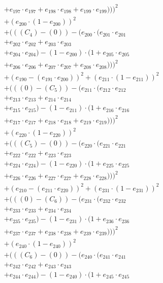 \documentclass[10pt, a4paper]{article}
\begin{document}
\begin{small}
\begin{align*}
& + e_{197} \cdot e_{197} + e_{198} \cdot e_{198} + e_{199} \cdot e_{199})))^{2} \\
& + (e_{200} \cdot (1 - e_{200}))^{2} \\
& + (((C_{4}) - (0)) - (e_{200} \cdot (e_{201} \cdot e_{201} \\
& + e_{202} \cdot e_{202} + e_{203} \cdot e_{203} \\
& + e_{204} \cdot e_{204}) - (1 - e_{200}) \cdot (1 + e_{205} \cdot e_{205} \\
& + e_{206} \cdot e_{206} + e_{207} \cdot e_{207} + e_{208} \cdot e_{208})))^{2} \\
& + (e_{190} - (e_{191} \cdot e_{200}))^{2} + (e_{211} \cdot (1 - e_{211}))^{2} \\
& + (((0) - (C_{5})) - (e_{211} \cdot (e_{212} \cdot e_{212} \\
& + e_{213} \cdot e_{213} + e_{214} \cdot e_{214} \\
& + e_{215} \cdot e_{215}) - (1 - e_{211}) \cdot (1 + e_{216} \cdot e_{216} \\
& + e_{217} \cdot e_{217} + e_{218} \cdot e_{218} + e_{219} \cdot e_{219})))^{2} \\
& + (e_{220} \cdot (1 - e_{220}))^{2} \\
& + (((C_{5}) - (0)) - (e_{220} \cdot (e_{221} \cdot e_{221} \\
& + e_{222} \cdot e_{222} + e_{223} \cdot e_{223} \\
& + e_{224} \cdot e_{224}) - (1 - e_{220}) \cdot (1 + e_{225} \cdot e_{225} \\
& + e_{226} \cdot e_{226} + e_{227} \cdot e_{227} + e_{228} \cdot e_{228})))^{2} \\
& + (e_{210} - (e_{211} \cdot e_{220}))^{2} + (e_{231} \cdot (1 - e_{231}))^{2} \\
& + (((0) - (C_{6})) - (e_{231} \cdot (e_{232} \cdot e_{232} \\
& + e_{233} \cdot e_{233} + e_{234} \cdot e_{234} \\
& + e_{235} \cdot e_{235}) - (1 - e_{231}) \cdot (1 + e_{236} \cdot e_{236} \\
& + e_{237} \cdot e_{237} + e_{238} \cdot e_{238} + e_{239} \cdot e_{239})))^{2} \\
& + (e_{240} \cdot (1 - e_{240}))^{2} \\
& + (((C_{6}) - (0)) - (e_{240} \cdot (e_{241} \cdot e_{241} \\
& + e_{242} \cdot e_{242} + e_{243} \cdot e_{243} \\
& + e_{244} \cdot e_{244}) - (1 - e_{240}) \cdot (1 + e_{245} \cdot e_{245} \\

\end{align*}
\end{small}
\end{document}
